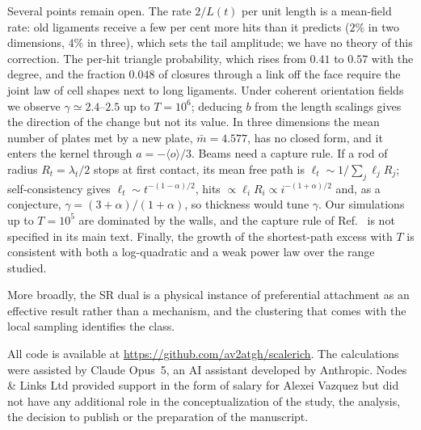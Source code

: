 \documentclass[pre,twocolumn,superscriptaddress,amsmath,amssymb,floatfix]{revtex4-2}
\begin{document}
Several points remain open. The rate $2/L(t)$ per unit length is a mean-field rate:
old ligaments receive a few per cent more hits than it predicts ($2\%$ in two
dimensions, $4\%$ in three), which sets the tail amplitude; we have no theory of this correction. The per-hit triangle probability, which rises from $0.41$ to $0.57$ with the
degree, and the fraction $0.048$ of closures through a link off the face require the joint law of cell shapes
next to long ligaments. Under coherent orientation fields we observe
$\gamma\simeq2.4$--$2.5$ up to $T=10^6$; deducing $b$ from the length scalings gives the
direction of the change but not its value. In three dimensions the mean number of plates met by a new plate,
$\bar m=4.577$, has no closed form, and it enters the kernel through $a=-\langle o\rangle/3$. Beams need a capture rule. If a rod of radius $R_t=\lambda_t/2$ stops at first
contact, its mean free path is $\ell_t\sim1/\sum_j\ell_jR_j$; self-consistency gives
$\ell_t\sim t^{-(1-\alpha)/2}$, hits $\propto\ell_iR_i\propto i^{-(1+\alpha)/2}$ and, as a
conjecture, $\gamma=(3+\alpha)/(1+\alpha)$, so thickness would tune $\gamma$. Our
simulations up to $T=10^5$ are dominated by the walls, and the capture rule of
Ref.~\cite{both2026} is not specified in its main text. Finally, the growth of the shortest-path excess with $T$ is
consistent with both a log-quadratic and a weak power law over the range studied.

More broadly, the SR dual is a physical instance of preferential attachment as an
effective result rather than a mechanism, and the clustering that comes with the local sampling identifies the class.

\begin{acknowledgments}
All code is available at \url{https://github.com/av2atgh/scalerich}.
The calculations were assisted by Claude Opus~5, an AI assistant developed by Anthropic. Nodes \& Links Ltd
provided support in the form of salary for Alexei Vazquez but did not have any additional role in the conceptualization of the study, the
analysis, the decision to publish or the preparation of the manuscript.
\end{acknowledgments}


\end{document}

